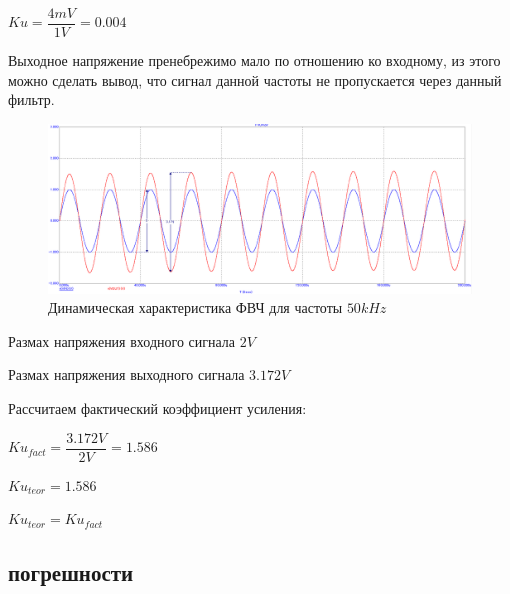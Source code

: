 \documentclass[a4paper,14pt]{article}
\begin{document}
$Ku = \dfrac{4mV}{1V} = 0.004$

Выходное напряжение пренебрежимо мало по отношению ко входному, из этого можно сделать вывод, что сигнал данной частоты не пропускается через данный фильтр.


\begin{figure}[H]
	\centering
	\includegraphics[width=0.95\linewidth]{../imgs/FVCH/garm_50k_V}
	\caption{Динамическая характеристика ФВЧ для частоты $50kHz$}
	\label{fig:garm50kv}
\end{figure}

Размах напряжения входного сигнала $2V$

Размах напряжения выходного сигнала $3.172V$

Рассчитаем фактический коэффициент усиления:

$Ku_{fact} = \dfrac{3.172V}{2V} = 1.586$

$Ku_{teor} = 1.586$

$Ku_{teor} = Ku_{fact}$


\subsection{погрешности}
\end{document}
